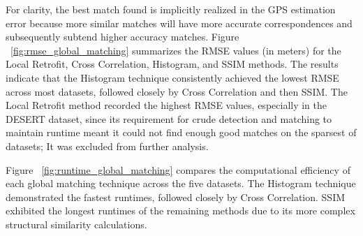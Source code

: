 For clarity, the best match found is implicitly realized in the GPS estimation error because more similar matches will have more accurate correspondences and subsequently subtend higher accuracy matches. Figure ~\ref{fig:rmse_global_matching} summarizes the RMSE values (in meters) for the Local Retrofit, Cross Correlation, Histogram, and SSIM methods. The results indicate that the Histogram technique consistently achieved the lowest RMSE across most datasets, followed closely by Cross Correlation and then SSIM. The Local Retrofit method recorded the highest RMSE values, especially in the DESERT dataset, since its requirement for crude detection and matching to maintain runtime meant it could not find enough good matches on the sparsest of datasets; It was excluded from further analysis.

Figure ~\ref{fig:runtime_global_matching} compares the computational efficiency of each global matching technique across the five datasets. The Histogram technique demonstrated the fastest runtimes, followed closely by Cross Correlation. SSIM exhibited the longest runtimes of the remaining methods due to its more complex structural similarity calculations. 


